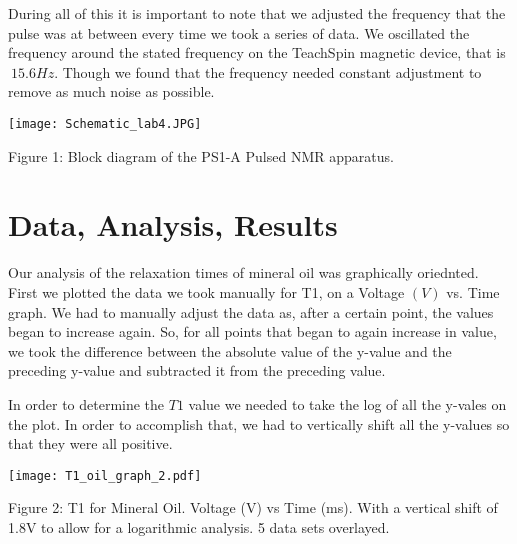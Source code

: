 \documentclass{article}
\begin{document}
    
    \bigskip
    
    During all of this it is important to note that we adjusted the frequency that the pulse was at between every time we took a series of data. We oscillated the frequency around the stated frequency on the TeachSpin magnetic device, that is $~15.6Hz$. Though we found that the frequency needed constant adjustment to remove as much noise as possible.
    
    \bigskip
    
    \par
    
    \bigskip

    \begin{figure5}
    \centering    
    \texttt{[image: Schematic\_lab4.JPG]}
   
    \caption{Figure 1: Block diagram of the PS1-A Pulsed NMR apparatus.}
    \par
    \end{figure5}
    \bigksip   

\section{Data, Analysis, Results}
    \bigskip
    Our analysis of the relaxation times of mineral oil was graphically oriednted. First we plotted the data we took manually for T1, on a Voltage $(V)$ vs. Time graph. We had to manually adjust the data as, after a certain point, the values began to increase again. So, for all points that began to again increase in value, we took the difference between the absolute value of the y-value and the preceding y-value and subtracted it from the preceding value.
    
    \bigskip
    
    In order to determine the $T1$ value we needed to take the log of all the y-vales on the plot. In order to accomplish that, we had to vertically shift all the y-values so that they were all positive.
    
    \bigskip
     
    
    \begin{figure996}
    \centering    
    \texttt{[image: T1\_oil\_graph\_2.pdf]}
    \par
    \centering
    \par
    \caption{Figure 2: T1 for Mineral Oil. Voltage (V) vs Time (ms). With a vertical shift of 1.8V to allow for a logarithmic analysis. 5 data sets overlayed.}
    \par
    \end{figure996}
    \bigksip
    
\end{document}
